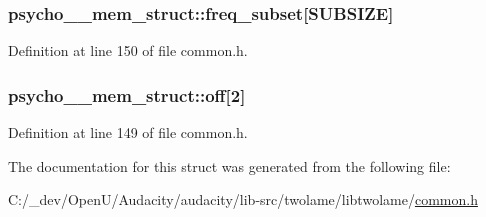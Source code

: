 \subsubsection[{\texorpdfstring{freq\+\_\+subset}{freq_subset}}]{ psycho\+\_\+\_\+mem\+\_\+struct\+::freq\+\_\+subset\mbox{[}{\bf S\+U\+B\+S\+I\+ZE}\mbox{]}}\hypertarget{structpsycho__3__mem__struct_ad1f171cd91c4a355096a36fa8a1fab97}{}\label{structpsycho__3__mem__struct_ad1f171cd91c4a355096a36fa8a1fab97}


Definition at line 150 of file common.\+h.

\subsubsection[{\texorpdfstring{off}{off}}]{ psycho\+\_\+\_\+mem\+\_\+struct\+::off\mbox{[}2\mbox{]}}\hypertarget{structpsycho__3__mem__struct_acdb6dff0bf3ee7d04a3950b0173f5ff5}{}\label{structpsycho__3__mem__struct_acdb6dff0bf3ee7d04a3950b0173f5ff5}


Definition at line 149 of file common.\+h.



The documentation for this struct was generated from the following file\+:\begin{DoxyCompactItemize}
\item 
C\+:/\+\_\+dev/\+Open\+U/\+Audacity/audacity/lib-\/src/twolame/libtwolame/\hyperlink{twolame_2libtwolame_2common_8h}{common.\+h}\end{DoxyCompactItemize}
